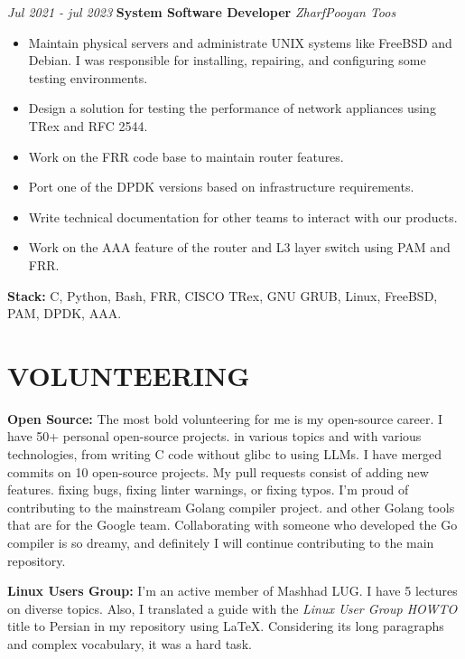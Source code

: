 \documentclass{engineercv}
\begin{document}
\vspace{0.5 cm}

\begin{twocolentry}{\textit{Jul 2021 - jul 2023}}
  \textbf{System Software Developer}
  \textit{ZharfPooyan Toos}

  \begin{itemize}
    \item Maintain physical servers and administrate UNIX systems like FreeBSD and Debian.
      I was responsible for installing, repairing, and configuring some testing environments.
    \item Design a solution for testing the performance of network appliances using TRex and RFC 2544.
    \item Work on the FRR code base to maintain router features.
    \item Port one of the DPDK versions based on infrastructure requirements.
    \item Write technical documentation for other teams to interact with our products.
    \item Work on the AAA feature of the router and L3 layer switch using PAM and FRR.
  \end{itemize}
\end{twocolentry}
\textbf{Stack:} C, Python, Bash, FRR, CISCO TRex, GNU GRUB, Linux, FreeBSD, PAM, DPDK, AAA.

\section{VOLUNTEERING}
\textbf{Open Source:} The most bold volunteering for me is my open-source career. I have 50+ personal open-source projects.
in various topics and with various technologies, from writing C code without glibc to using LLMs.
I have merged commits on 10 open-source projects. My pull requests consist of adding new features.
fixing bugs, fixing linter warnings, or fixing typos.  I'm proud of contributing to the mainstream Golang compiler project.
and other Golang tools that are for the Google team. Collaborating with someone who developed the Go compiler
is so dreamy, and definitely I will continue contributing to the main repository.

\vspace{0.4 cm}

\textbf{Linux Users Group:} I'm an active member of Mashhad LUG. I have 5 lectures on diverse topics.
Also, I translated a guide with the \textit{Linux User Group HOWTO} title to Persian in my repository using LaTeX.
Considering its long paragraphs and complex vocabulary, it was a hard task.
\end{document}

